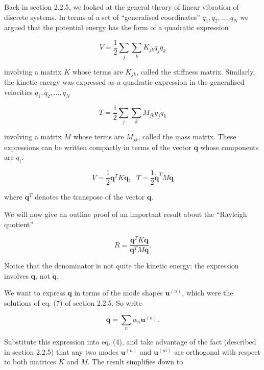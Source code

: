   Back in section 2.2.5, we looked at the general theory of linear vibration of 
  discrete systems. In terms of a set of ``generalised coordinates'' 
  $q_1,q_2,\dots,q_N$ we argued that the potential energy has the form of a 
  quadratic expression 

  \begin{equation*}V=\dfrac{1}{2}\sum_j \sum_k K_{jk} q_j q_k 
  \tag{1}\end{equation*} 

  \noindent{}involving a matrix $K$ whose terms are $K_{jk}$, called the 
  stiffness matrix. Similarly, the kinetic energy was expressed as a quadratic 
  expression in the generalised velocities 
  $\dot{q}_1,\dot{q}_2,\dots,\dot{q}_N$ 

  \begin{equation*}T=\dfrac{1}{2}\sum_j \sum_k M_{jk} \dot{q}_j 
  \dot{q}_k\tag{2}\end{equation*} 

  \noindent{}involving a matrix $M$ whose terms are $M_{jk}$, called the mass 
  matrix. These expressions can be written compactly in terms of the vector 
  $\mathbf{q}$ whose components are $q_i$: 

  \begin{equation*}V=\frac{1}{2} \mathbf{q}^T K \mathbf{q},~~~T=\frac{1}{2} 
  \mathbf{\dot{q}}^T M \mathbf{\dot{q}}\tag{3}\end{equation*} 

  \noindent{}where $\mathbf{q}^T$ denotes the transpose of the vector 
  $\mathbf{q}$. 

  We will now give an outline proof of an important result about the ``Rayleigh 
  quotient'' 

  \begin{equation*}R=\frac{\mathbf{q}^T K \mathbf{q}}{\mathbf{q}^T M 
  \mathbf{q}} .\tag{4}\end{equation*} 

  Notice that the denominator is not quite the kinetic energy: the expression 
  involves $\mathbf{q}$, not $\mathbf{\dot{q}}$. 

  We want to express $\mathbf{q}$ in terms of the mode shapes 
  $\mathbf{u}^{(n)}$, which were the solutions of eq. (7) of section 2.2.5. So 
  write 

  \begin{equation*}\mathbf{q}=\sum_n{\alpha_n \mathbf{u}^{(n)}} 
  .\tag{5}\end{equation*} 

  Substitute this expression into eq. (4), and take advantage of the fact 
  (described in section 2.2.5) that any two modes $\mathbf{u}^{(n)}$ and 
  $\mathbf{u}^{(m)}$ are orthogonal with respect to both matrices $K$ and $M$. 
  The result simplifies down to 

